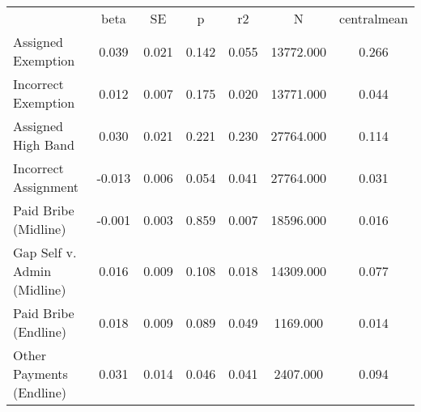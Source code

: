 {\def\sym#1{\ifmmode^{#1}\else\(^{#1}\)\fi} \begin{tabular}{l*{6}{c}} \hline\hline 
& beta & SE & p & r2 & N & centralmean \\
Assigned Exemption & 0.039 & 0.021 & 0.142 & 0.055 & 13772.000 & 0.266 \\
Incorrect Exemption & 0.012 & 0.007 & 0.175 & 0.020 & 13771.000 & 0.044 \\
Assigned High Band & 0.030 & 0.021 & 0.221 & 0.230 & 27764.000 & 0.114 \\
Incorrect Assignment & -0.013 & 0.006 & 0.054 & 0.041 & 27764.000 & 0.031 \\
Paid Bribe (Midline) & -0.001 & 0.003 & 0.859 & 0.007 & 18596.000 & 0.016 \\
Gap Self v. Admin (Midline) & 0.016 & 0.009 & 0.108 & 0.018 & 14309.000 & 0.077 \\
Paid Bribe (Endline) & 0.018 & 0.009 & 0.089 & 0.049 & 1169.000 & 0.014 \\
Other Payments (Endline) & 0.031 & 0.014 & 0.046 & 0.041 & 2407.000 & 0.094 \\
\hline\hline \end{tabular} }
